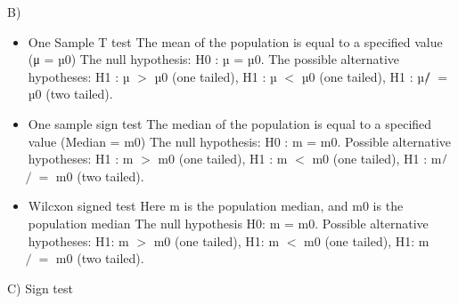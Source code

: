 \documentclass[10pt,letterpaper]{article}
\begin{document}
B)
 \begin{itemize}
    \item One Sample T test
The mean of the population is equal to a specified value (μ = µ0)
    The null hypothesis: H0 : µ = µ0.
    The possible alternative hypotheses:
    H1 : µ $>$ µ0 (one tailed),
    H1 : µ $<$ µ0 (one tailed),
    H1 : µ ̸$̸=$ µ0 (two tailed).

\item One sample sign test
The median of the population is equal to a specified value (Median = m0)
The null hypothesis: H0 : m = m0.
Possible alternative hypotheses:
H1 : m $>$ m0 (one tailed),
H1 : m $<$ m0 (one tailed),
H1 : m ̸$̸=$ m0 (two tailed).

\item Wilcxon signed test
Here m is the population median, and m0 is the population median
The null hypothesis H0: m = m0.
Possible alternative hypotheses:
H1: m $>$ m0 (one tailed),
H1: m $<$ m0 (one tailed),
H1: m $̸=$  m0 (two tailed).
\end{itemize} 

C) Sign test
\end{document}
